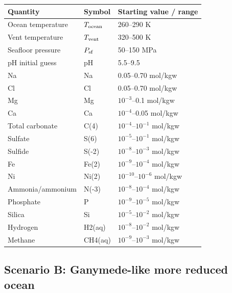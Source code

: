\documentclass[11pt]{article}
\newcommand{\SIrange}[3]{#1--#2 #3}
\begin{document}
\begin{longtable}{lll}
\toprule
Quantity & Symbol & Starting value / range \\
\midrule
Ocean temperature & $T_{\rm ocean}$ & \SIrange{260}{290}{K} \\
Vent temperature & $T_{\rm vent}$ & \SIrange{320}{500}{K} \\
Seafloor pressure & $P_{\rm sf}$ & \SIrange{50}{150}{MPa} \\
pH initial guess & pH & 5.5--9.5 \\
Na & Na & 0.05--0.70 mol/kgw \\
Cl & Cl & 0.05--0.70 mol/kgw \\
Mg & Mg & $10^{-3}$--0.1 mol/kgw \\
Ca & Ca & $10^{-4}$--0.05 mol/kgw \\
Total carbonate & C(4) & $10^{-4}$--$10^{-1}$ mol/kgw \\
Sulfate & S(6) & $10^{-5}$--$10^{-1}$ mol/kgw \\
Sulfide & S(-2) & $10^{-8}$--$10^{-3}$ mol/kgw \\
Fe & Fe(2) & $10^{-9}$--$10^{-4}$ mol/kgw \\
Ni & Ni(2) & $10^{-10}$--$10^{-6}$ mol/kgw \\
Ammonia/ammonium & N(-3) & $10^{-8}$--$10^{-4}$ mol/kgw \\
Phosphate & P & $10^{-9}$--$10^{-5}$ mol/kgw \\
Silica & Si & $10^{-5}$--$10^{-2}$ mol/kgw \\
Hydrogen & H2(aq) & $10^{-8}$--$10^{-2}$ mol/kgw \\
Methane & CH4(aq) & $10^{-9}$--$10^{-3}$ mol/kgw \\
\bottomrule
\end{longtable}

\subsection{Scenario B: Ganymede-like more reduced ocean}
\end{document}
